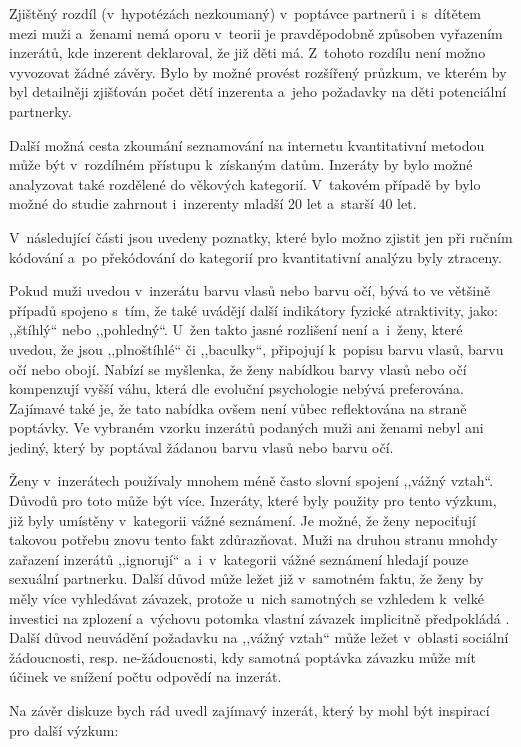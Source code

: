 \documentclass[a4paper, 12pt, notitlepage, oneside, numbers=noenddot]{report}
\begin{document}
Zjištěný rozdíl (v~hypotézách nezkoumaný) v~poptávce partnerů
i~s~dítětem mezi muži a~ženami nemá oporu v~teorii je pravděpodobně
způsoben vyřazením inzerátů, kde inzerent deklaroval, že již děti má.
Z~tohoto rozdílu není možno vyvozovat žádné závěry.  Bylo by možné
provést rozšířený průzkum, ve kterém by byl detailněji zjišťován počet
dětí inzerenta a~jeho požadavky na děti potenciální partnerky.

Další možná cesta zkoumání seznamování na internetu kvantitativní
metodou může být v~rozdílném přístupu k~získaným datům.  Inzeráty by
bylo možné analyzovat také rozdělené do věkových kategorií.  V~takovém
případě by bylo možné do studie zahrnout i~inzerenty mladší 20 let
a~starší 40 let.

V~následující části jsou uvedeny poznatky, které bylo možno zjistit
jen při ručním kódování a~po překódování do kategorií pro
kvantitativní analýzu byly ztraceny.

Pokud muži uvedou v~inzerátu barvu vlasů nebo barvu očí, bývá to ve
většině případů spojeno s~tím, že také uvádějí další indikátory
fyzické atraktivity, jako: ,,štíhlý`` nebo ,,pohledný``. U~žen takto
jasné rozlišení není a~i~ženy, které uvedou, že jsou ,,plnoštíhlé``
či ,,baculky``, připojují k~popisu barvu vlasů, barvu očí nebo
obojí. Nabízí se myšlenka, že ženy nabídkou barvy vlasů nebo očí
kompenzují vyšší váhu, která dle evoluční psychologie nebývá
preferována.  Zajímavé také je, že tato nabídka ovšem není vůbec
reflektována na straně poptávky.  Ve vybraném vzorku inzerátů podaných
muži ani ženami nebyl ani jediný, který by poptával žádanou barvu
vlasů nebo barvu očí.

Ženy v~inzerátech používaly mnohem méně často slovní spojení ,,vážný
vztah``.  Důvodů pro toto může být více.  Inzeráty, které byly použity
pro tento výzkum, již byly umístěny v~kategorii vážné seznámení.  Je
možné, že ženy nepociťují takovou potřebu znovu tento fakt
zdůrazňovat.  Muži na druhou stranu mnohdy zařazení inzerátů
,,ignorují`` a~i~v~ka\-te\-gorii vážné seznámení hledají pouze sexuální
partnerku.  Další důvod může ležet již v~samotném faktu, že ženy by
měly více vyhledávat závazek, protože u~nich samotných se vzhledem
k~velké investici na zplození a~výchovu potomka vlastní závazek
implicitně předpokládá \citep{Trivers1972}.  Další důvod neuvádění
požadavku na ,,vážný vztah`` může ležet v~oblasti sociální
žádoucnosti, resp. ne-žádoucnosti, kdy samotná poptávka závazku může
mít účinek ve snížení počtu odpovědí na inzerát.

Na závěr diskuze bych rád uvedl zajímavý inzerát, který by mohl být
inspirací pro další výzkum:
\end{document}
